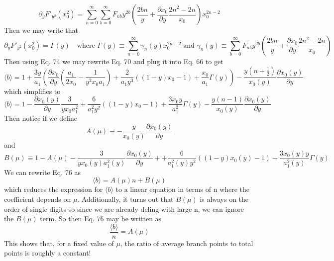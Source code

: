 \documentclass{article}
\begin{document}
\begin{equation}
\partial_yF'_{y^2}(x_0^2)=\sum_{n=0}^\infty\sum_{b=0}^\infty F_{nb}y^{2b}\left(\frac{2bn}{y}+\frac{\partial x_0}{\partial y}\frac{2n^2-2n}{x_0} \right)x_0^{2n-2}
\end{equation}
Then we may write that 
\begin{equation}
\partial_yF'_{y^2}(x_0^2)=\Gamma(y) \quad \text{where } \Gamma(y) \equiv \sum_{n=0}^\infty \gamma_n(y)x_0^{2n-2} \; \text{and } \gamma_n(y) \equiv \sum_{b=0}^\infty F_{nb}y^{2b}\left(\frac{2bn}{y}+\frac{\partial x_0}{\partial y}\frac{2n^2-2n}{x_0} \right)
\end{equation}
Then using Eq. 74 we may rewrite Eq. 70 and plug it into Eq. 66 to get
\begin{equation}
\langle b\rangle = 1+ \frac{3y}{a_1}\left(\frac{\partial x_0}{\partial y}\left(\frac{a_1}{2x_0}-\frac{1}{y^2x_0a_1}\right) +\frac{2}{a_1y^3}((1-y)x_0-1)+\frac{x_0}{a_1}\Gamma(y)\right)-\frac{y(n+\frac{1}{2})}{x_0(y)}\frac{\partial x_0(y)}{\partial y}
\end{equation}
which simplifies to 
\begin{equation}
\langle b\rangle = 1-\frac{\partial x_0(y)}{\partial y}\frac{3}{yx_0a_1^2} +\frac{6}{a_1^2y^2}((1-y)x_0-1)+\frac{3x_0y}{a_1^2}\Gamma(y)-\frac{y(n-1)}{x_0(y)}\frac{\partial x_0(y)}{\partial y}
\end{equation}
Then notice if we define
\begin{equation}
A(\mu) \equiv -\frac{y}{x_0(y)}\frac{\partial x_0(y)}{\partial y}
\end{equation}
and
\begin{equation}
B(\mu) \equiv 1-A(\mu) -\frac{3}{yx_0(y)a_1^2(y)}\frac{\partial x_0(y)}{\partial y}++\frac{6}{a_1^2(y)y^2}((1-y)x_0(y)-1)+\frac{3x_0(y)y}{a_1^2(y)}\Gamma(y)
\end{equation}
We can rewrite Eq. 76 as 
\begin{equation}
\langle b\rangle = A(\mu)n+B(\mu)
\end{equation}
which reduces the expression for \(\langle b\rangle\) to a linear equation in terms of n where the coefficient depends on \(\mu\). Additionally, it turns out that \(B(\mu)\) is always on the order of single digits so since we are already deling with large n, we can ignore the \(B(\mu)\) term. So then Eq. 76 may be written as 
\begin{equation}
\frac{\langle b\rangle}{n}=A(\mu)
\end{equation}
This shows that, for a fixed value of \(\mu\), the ratio of average branch points to total points is roughly a constant!
\end{document}
